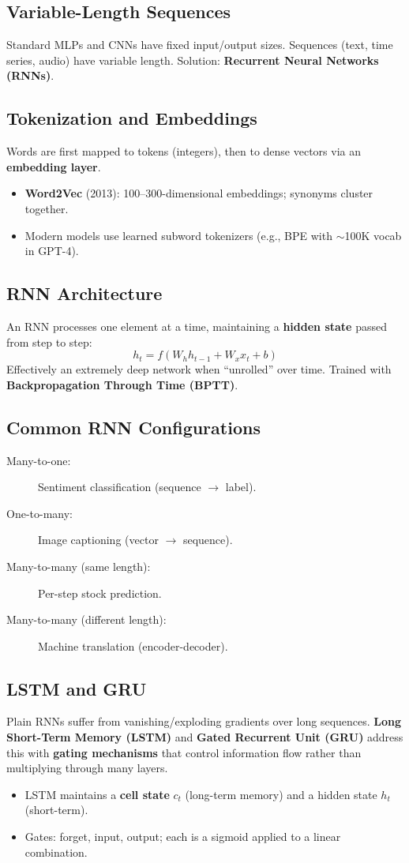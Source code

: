 \documentclass[11pt]{article}
\begin{document}
\subsection{Variable-Length Sequences}
Standard MLPs and CNNs have fixed input/output sizes. Sequences (text, time series, audio) have variable length. Solution: \textbf{Recurrent Neural Networks (RNNs)}.

\subsection{Tokenization and Embeddings}
Words are first mapped to tokens (integers), then to dense vectors via an \textbf{embedding layer}.
\begin{itemize}
  \item \textbf{Word2Vec} (2013): 100--300-dimensional embeddings; synonyms cluster together.
  \item Modern models use learned subword tokenizers (e.g., BPE with $\sim$100K vocab in GPT-4).
\end{itemize}

\subsection{RNN Architecture}
An RNN processes one element at a time, maintaining a \textbf{hidden state} passed from step to step:
\[
  h_t = f(W_h h_{t-1} + W_x x_t + b)
\]
Effectively an extremely deep network when ``unrolled'' over time. Trained with \textbf{Backpropagation Through Time (BPTT)}.

\subsection{Common RNN Configurations}
\begin{description}
  \item[Many-to-one:] Sentiment classification (sequence $\to$ label).
  \item[One-to-many:] Image captioning (vector $\to$ sequence).
  \item[Many-to-many (same length):] Per-step stock prediction.
  \item[Many-to-many (different length):] Machine translation (encoder-decoder).
\end{description}

\subsection{LSTM and GRU}
Plain RNNs suffer from vanishing/exploding gradients over long sequences. \textbf{Long Short-Term Memory (LSTM)} and \textbf{Gated Recurrent Unit (GRU)} address this with \textbf{gating mechanisms} that control information flow rather than multiplying through many layers.
\begin{itemize}
  \item LSTM maintains a \textbf{cell state} $c_t$ (long-term memory) and a hidden state $h_t$ (short-term).
  \item Gates: forget, input, output; each is a sigmoid applied to a linear combination.
\end{itemize}
\end{document}
